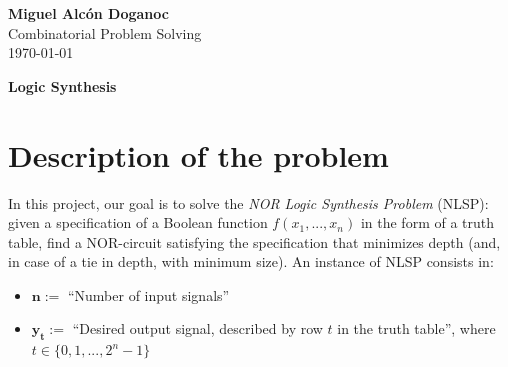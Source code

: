 \documentclass[letterpaper,10pt]{article}
\begin{document}
\noindent
\begin{flushright}
    \large\textbf{Miguel Alcón Doganoc} \\
    Combinatorial Problem Solving \\
    \today
\end{flushright}

\newcommand{\code}[1]{\texttt{#1}}

\noindent
{\huge{\textbf{Logic Synthesis}}}

\section{Description of the problem}
In this project, our goal is to solve the \textit{NOR Logic Synthesis Problem}
(NLSP): given a specification of a Boolean function $f(x_1,...,x_n)$ in the form of a truth table, find a NOR-circuit satisfying the specification that minimizes depth (and, in case of a tie in depth, with minimum size). An instance of NLSP consists in:
\begin{itemize}
    \item $\mathbf{n} := $ ``Number of input signals''
    \item $\mathbf{y_t} := $ ``Desired output signal, described by row $t$ in the truth table'', where $t \in \{0,1,...,2^n-1\}$  
\end{itemize}
\end{document}
